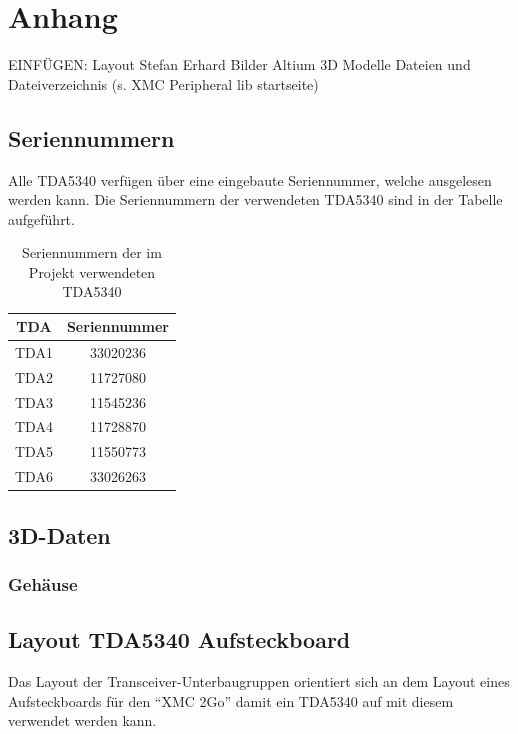 \chapter{Anhang}
\label{sec:Anhang}
\pagestyle{scrheadings}
EINFÜGEN:
Layout Stefan Erhard
Bilder Altium
3D Modelle
Dateien und Dateiverzeichnis (s. XMC Peripheral lib startseite)

\section{Seriennummern}
\label{app:Seriennummern}
Alle TDA5340 verfügen über eine eingebaute Seriennummer, welche ausgelesen werden kann. Die Seriennummern der verwendeten TDA5340 sind in der Tabelle aufgeführt.
\begin{table}[h]
\centering
\begin{tabular}{cc}
TDA & Seriennummer\\
\hline
TDA1 & 33020236\\
TDA2 & 11727080\\
TDA3& 11545236\\
TDA4& 11728870\\
TDA5& 11550773\\
TDA6& 33026263\\
\end{tabular}
\caption{Seriennummern der im Projekt verwendeten TDA5340 }
\label{default}
\end{table}

\section{3D-Daten}
\subsection{Gehäuse}
\label{app:Gehäuse}

\newpage
\section{Layout TDA5340 Aufsteckboard}
Das Layout der Transceiver-Unterbaugruppen orientiert sich an dem Layout eines Aufsteckboards für den \enquote{XMC 2Go} damit ein TDA5340 auf mit diesem verwendet werden kann. 

